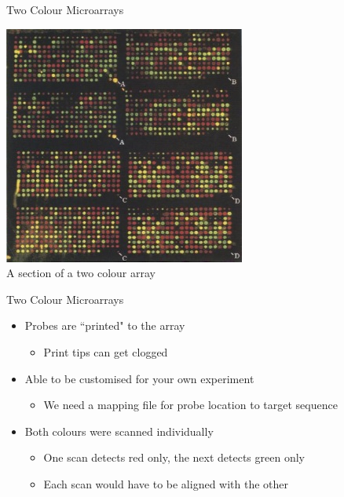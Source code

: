 \documentclass[aspectratio=169,11pt]{beamer}
\begin{document}
\begin{frame}{Two Colour Microarrays}

	\begin{center}
	\includegraphics[scale=0.5]{figures/2colour.jpg} 
	~\\
	A section of a two colour array
	\end{center}

\end{frame}

\begin{frame}{Two Colour Microarrays}

	\begin{itemize}
		\item Probes are ``printed" to the array
		\begin{itemize}
			\item Print tips can get clogged
		\end{itemize}
		\item Able to be customised for your own experiment
		\begin{itemize}
			\item We need a mapping file for probe location to target sequence
		\end{itemize}
		\item Both colours were scanned individually
		\begin{itemize}
			\item One scan detects red only, the next detects green only
			\item Each scan would have to be aligned with the other
		\end{itemize}
		
	\end{itemize}

\end{frame}
\end{document}
